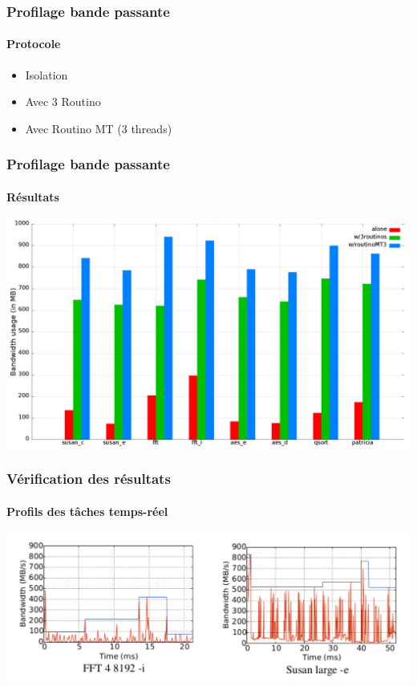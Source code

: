 \begin{frame}
\frametitle{Profilage bande passante}
\framesubtitle{Protocole}
\begin{itemize}
  \item Isolation
    \vspace{1em}
  \item Avec 3 Routino
    \vspace{1em}
  \item Avec Routino MT (3 threads)
\end{itemize}
\end{frame}


\begin{frame}
\frametitle{Profilage bande passante}
\framesubtitle{Résultats}
\begin{center}
\includegraphics[scale=0.2]{include/bandwidth.png}
\end{center}
\end{frame}


\begin{frame}
\frametitle{Vérification des résultats}
\framesubtitle{Profils des tâches temps-réel}
\begin{center}
\includegraphics[scale=0.35]{include/profilsTR.pdf}
\end{center}
\end{frame}

